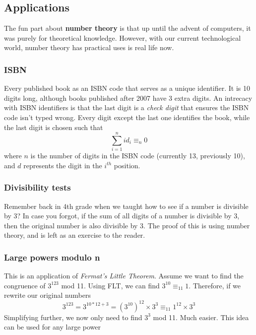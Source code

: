 \documentclass{article}
\begin{document}
\subsection{Applications}
The fun part about \textbf{number theory} is that up until the advent of computers, it was purely for theoretical knowledge. However, with our current technological world, number theory has practical uses is real life now.
\subsubsection{ISBN}
Every published book as an ISBN code that serves as a unique identifier. It is 10 digits long, although books published after 2007 have 3 extra digits. An intrecacy with ISBN identifiers is that the last digit is a \textit{check digit} that ensures the ISBN code isn't typed wrong. Every digit except the last one identifies the book, while the last digit is chosen such that 
\[\sum^n_{i=1}id_i\equiv_n 0\]
where $n$ is the number of digits in the ISBN code (currently 13, previously 10), and $d$ represents the digit in the $i^{th}$ position.
\subsubsection{Divisibility tests}
Remember back in 4th grade when we taught how to see if a number is divisible by 3? In case you forgot, if the sum of all digits of a number is divisible by 3, then the original number is also divisible by 3. The proof of this is using number theory, and is left as an exercise to the reader.
\subsubsection{Large powers modulo n}
This is an application of \textit{Fermat's Little Theorem}. Assume we want to find the congruence of $3^{123}$ mod 11. Using FLT, we can find $3^{10}\equiv_{11} 1$. Therefore, if we rewrite our original numbers
\[3^{123} = 3^{10*12+3} = (3^{10})^{12}\times3^3\equiv_{11}1^{12} \times 3^3\]
Simplifying further, we now only need to find $3^{3}$ mod 11. Much easier. This idea can be used for any large power
\end{document}
